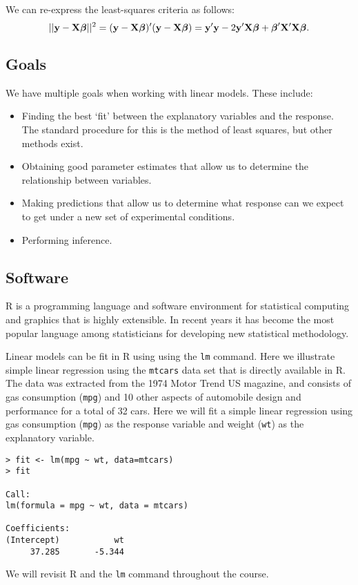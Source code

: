\bsnote
We  can re-express the least-squares criteria as follows:
$$
||\mathbf{y} - \mathbf{X}\mbox{\boldmath $\beta$}||^2 = (\mathbf{y} - \mathbf{X}\mbox{\boldmath $\beta$})'(\mathbf{y} - \mathbf{X}\mbox{\boldmath $\beta$}) = \mathbf{y}' \mathbf{y} - 2 \mathbf{y}' \mathbf{X} \mbox{\boldmath $\beta$}  + \mbox{\boldmath $\beta$}' \mathbf{X}' \mathbf{X}  \mbox{\boldmath $\beta$} .
$$
\esnote


\vb
\subsection{Goals}

We have multiple goals when working with linear models. These include: 
\begin{itemize}
\item  Finding the best `fit' between the explanatory variables and the response.  The standard procedure for this is the method of least squares, but other methods exist.

\item Obtaining good parameter estimates that allow us to determine the relationship between variables.

\item Making predictions that allow us to determine what response can we expect to get under a new set of experimental conditions.

\item Performing inference.

\end{itemize}

\vb
\subsection{Software}

\textsf{R} is a programming language and software environment for statistical computing and graphics that is highly extensible. In recent years it has become the most popular language among statisticians for developing new statistical methodology.

Linear models can be fit in  \textsf{R} using using the \texttt{lm} command. Here we illustrate simple linear regression using the \texttt{mtcars} data set that is directly available in \textsf{R}.
The data was extracted from the 1974 Motor Trend US magazine, and consists of gas consumption (\texttt{mpg}) and 10 other aspects of automobile design and performance for a total of 32 cars. Here we will fit a simple linear regression using gas consumption (\texttt{mpg}) as the response variable and weight (\texttt{wt}) as the explanatory variable.

\begin{verbatim}
> fit <- lm(mpg ~ wt, data=mtcars)
> fit

Call:
lm(formula = mpg ~ wt, data = mtcars)

Coefficients:
(Intercept)           wt  
     37.285       -5.344  
\end{verbatim}

We will revisit \textsf{R} and the \texttt{lm} command throughout the course.





